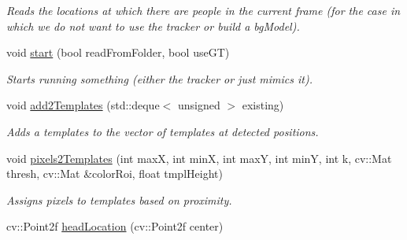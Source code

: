 \begin{DoxyCompactItemize}
\begin{DoxyCompactList}\small\item\em Reads the locations at which there are people in the current frame (for the case in which we do not want to use the tracker or build a bgModel). \item\end{DoxyCompactList}\item 
\hypertarget{classpeopleDetector_abd0d4dd5fbb252d876a682ef48e33392}{
void \hyperlink{classpeopleDetector_abd0d4dd5fbb252d876a682ef48e33392}{start} (bool readFromFolder, bool useGT)}
\label{classpeopleDetector_abd0d4dd5fbb252d876a682ef48e33392}

\begin{DoxyCompactList}\small\item\em Starts running something (either the tracker or just mimics it). \item\end{DoxyCompactList}\item 
\hypertarget{classpeopleDetector_acde70edbe5bb04eba4f9cdcb64b2e6f1}{
void \hyperlink{classpeopleDetector_acde70edbe5bb04eba4f9cdcb64b2e6f1}{add2Templates} (std::deque$<$ unsigned $>$ existing)}
\label{classpeopleDetector_acde70edbe5bb04eba4f9cdcb64b2e6f1}

\begin{DoxyCompactList}\small\item\em Adds a templates to the vector of templates at detected positions. \item\end{DoxyCompactList}\item 
\hypertarget{classpeopleDetector_aa9fbbe633f04c17f6b590c931649aa9d}{
void \hyperlink{classpeopleDetector_aa9fbbe633f04c17f6b590c931649aa9d}{pixels2Templates} (int maxX, int minX, int maxY, int minY, int k, cv::Mat thresh, cv::Mat \&colorRoi, float tmplHeight)}
\label{classpeopleDetector_aa9fbbe633f04c17f6b590c931649aa9d}

\begin{DoxyCompactList}\small\item\em Assigns pixels to templates based on proximity. \item\end{DoxyCompactList}\item 
\hypertarget{classpeopleDetector_a68f0da56d1137c3651d3cf7979325b6e}{
cv::Point2f \hyperlink{classpeopleDetector_a68f0da56d1137c3651d3cf7979325b6e}{headLocation} (cv::Point2f center)}
\label{classpeopleDetector_a68f0da56d1137c3651d3cf7979325b6e}


\end{DoxyCompactItemize}

